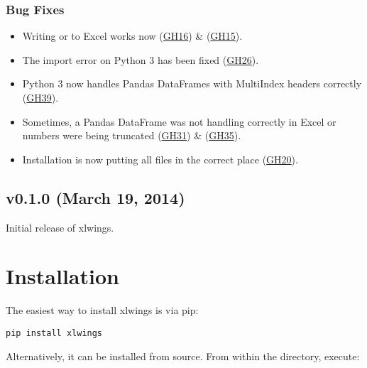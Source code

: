 \documentclass[letterpaper,11pt,english]{sphinxmanual}
\begin{document}
\subsection{Bug Fixes}
\label{whatsnew:id2}\begin{itemize}
\item {} 
Writing  or  to Excel works now (\href{https://github.com/ZoomerAnalytics/xlwings/issues/16}{GH16}) \& (\href{https://github.com/ZoomerAnalytics/xlwings/issues/15}{GH15}).

\item {} 
The import error on Python 3 has been fixed (\href{https://github.com/ZoomerAnalytics/xlwings/issues/26}{GH26}).

\item {} 
Python 3 now handles Pandas DataFrames with MultiIndex headers correctly (\href{https://github.com/ZoomerAnalytics/xlwings/issues/39}{GH39}).

\item {} 
Sometimes, a Pandas DataFrame was not handling  correctly in Excel or numbers were being truncated
(\href{https://github.com/ZoomerAnalytics/xlwings/issues/31}{GH31}) \& (\href{https://github.com/ZoomerAnalytics/xlwings/issues/35}{GH35}).

\item {} 
Installation is now putting all files in the correct place (\href{https://github.com/ZoomerAnalytics/xlwings/issues/20}{GH20}).

\end{itemize}


\section{v0.1.0 (March 19, 2014)}
\label{whatsnew:v0-1-0-march-19-2014}
Initial release of xlwings.


\chapter{Installation}
\label{installation:installation}\label{installation::doc}\label{installation:id1}
The easiest way to install xlwings is via pip:

\begin{Verbatim}[commandchars=\\\{\}]
pip install xlwings
\end{Verbatim}

Alternatively, it can be installed from source. From within the  directory, execute:
\end{document}
